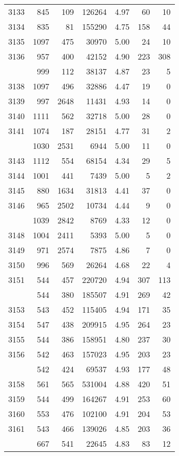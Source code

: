 \documentclass[
]{article}
\begin{document}
\begin{table}
\begin{tabular}[t]{lrrrrrr}
3133 & 845 & 109 & 126264 & 4.97 & 60 & 10\\
3134 & 835 & 81 & 155290 & 4.75 & 158 & 44\\
3135 & 1097 & 475 & 30970 & 5.00 & 24 & 10\\
3136 & 957 & 400 & 42152 & 4.90 & 223 & 308\\
\addlinespace
3137 & 999 & 112 & 38137 & 4.87 & 23 & 5\\
3138 & 1097 & 496 & 32886 & 4.47 & 19 & 0\\
3139 & 997 & 2648 & 11431 & 4.93 & 14 & 0\\
3140 & 1111 & 562 & 32718 & 5.00 & 28 & 0\\
3141 & 1074 & 187 & 28151 & 4.77 & 31 & 2\\
\addlinespace
3142 & 1030 & 2531 & 6944 & 5.00 & 11 & 0\\
3143 & 1112 & 554 & 68154 & 4.34 & 29 & 5\\
3144 & 1001 & 441 & 7439 & 5.00 & 5 & 2\\
3145 & 880 & 1634 & 31813 & 4.41 & 37 & 0\\
3146 & 965 & 2502 & 10734 & 4.44 & 9 & 0\\
\addlinespace
3147 & 1039 & 2842 & 8769 & 4.33 & 12 & 0\\
3148 & 1004 & 2411 & 5393 & 5.00 & 5 & 0\\
3149 & 971 & 2574 & 7875 & 4.86 & 7 & 0\\
3150 & 996 & 569 & 26264 & 4.68 & 22 & 4\\
3151 & 544 & 457 & 220720 & 4.94 & 307 & 113\\
\addlinespace
3152 & 544 & 380 & 185507 & 4.91 & 269 & 42\\
3153 & 543 & 452 & 115405 & 4.94 & 171 & 35\\
3154 & 547 & 438 & 209915 & 4.95 & 264 & 23\\
3155 & 544 & 386 & 158951 & 4.80 & 237 & 30\\
3156 & 542 & 463 & 157023 & 4.95 & 203 & 23\\
\addlinespace
3157 & 542 & 424 & 69537 & 4.93 & 177 & 48\\
3158 & 561 & 565 & 531004 & 4.88 & 420 & 51\\
3159 & 544 & 499 & 164267 & 4.91 & 253 & 60\\
3160 & 553 & 476 & 102100 & 4.91 & 204 & 53\\
3161 & 543 & 466 & 139026 & 4.85 & 203 & 36\\
\addlinespace
3162 & 667 & 541 & 22645 & 4.83 & 83 & 12\\

\end{tabular}
\end{table}
\end{document}
